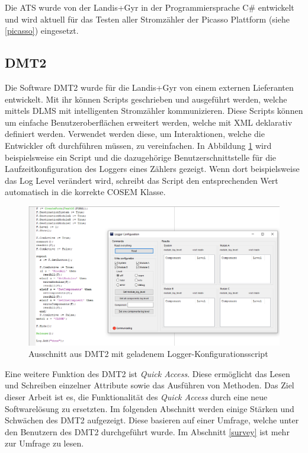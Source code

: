 Die \ac{ATS} wurde von der Landis+Gyr in der Programmiersprache C\# entwickelt und wird aktuell für das Testen aller Stromzähler der Picasso Plattform (siehe \ref{picasso}) eingesetzt.



\subsection{DMT2}\label{dmt}
Die Software \ac{DMT2} wurde für die Landis+Gyr von einem externen Lieferanten entwickelt.
Mit ihr können Scripts geschrieben und ausgeführt werden, welche mittels \ac{DLMS} mit intelligenten Stromzähler kommunizieren.
Diese Scripts können um einfache Benutzeroberflächen erweitert werden, welche mit XML deklarativ definiert werden.
Verwendet werden diese, um Interaktionen, welche die Entwickler oft durchführen müssen, zu vereinfachen.
In Abbildung \ref{fig:dmt2logger} wird beispielsweise ein Script und die dazugehörige Benutzerschnittstelle für die Laufzeitkonfiguration des Loggers eines Zählers gezeigt.
Wenn dort beispielsweise das Log Level verändert wird, schreibt das Script den entsprechenden Wert automatisch in die korrekte \ac{COSEM} Klasse.
\begin{figure}[H]
   \centering
   \includegraphics[width=1.0\textwidth]{gfx/dmt2logger.png}
   \caption{
      Ausschnitt aus \ac{DMT2} mit geladenem Logger-Konfigurationsscript
   }
   \label{fig:dmt2logger}
\end{figure}

Eine weitere Funktion des \ac{DMT2} ist \textit{Quick Access}.
Diese ermöglicht das Lesen und Schreiben einzelner Attribute sowie das Ausführen von Methoden.
Das Ziel dieser Arbeit ist es, die Funktionalität des \textit{Quick Access} durch eine neue Softwarelösung zu ersetzten.
Im folgenden Abschnitt werden einige Stärken und Schwächen des \ac{DMT2} aufgezeigt.
Diese basieren auf einer Umfrage, welche unter den Benutzern des \ac{DMT2} durchgeführt wurde.
Im Abschnitt \ref{survey} ist mehr zur Umfrage zu lesen.

